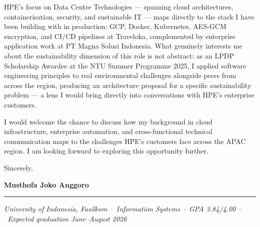 \documentclass[11pt,a4paper]{article}
\begin{document}
HPE's focus on Data Centre Technologies --- spanning cloud architectures,
containerisation, security, and sustainable IT --- maps directly to the stack
I have been building with in production: GCP, Docker, Kubernetes, AES-GCM
encryption, and CI/CD pipelines at Traveloka, complemented by enterprise
application work at PT Magna Solusi Indonesia.
What genuinely interests me about the sustainability dimension of this role is
not abstract: as an LPDP Scholarship Awardee at the NTU Summer Programme 2025,
I applied software engineering principles to real environmental challenges
alongside peers from across the region, producing an architecture proposal for
a specific sustainability problem --- a lens I would bring directly into
conversations with HPE's enterprise customers.

I would welcome the chance to discuss how my background in cloud infrastructure,
enterprise automation, and cross-functional technical communication maps to the
challenges HPE's customers face across the APAC region.
I am looking forward to exploring this opportunity further.

\vspace{10pt}
Sincerely,

\vspace{18pt}
\textbf{Musthofa Joko Anggoro}

\vspace{10pt}\hrule\vspace{6pt}
\footnotesize
\textit{University of Indonesia, Fasilkom\ $\cdot$\ Information Systems\ $\cdot$\
GPA 3.84/4.00\ $\cdot$\ Expected graduation June--August 2026}
\end{document}
